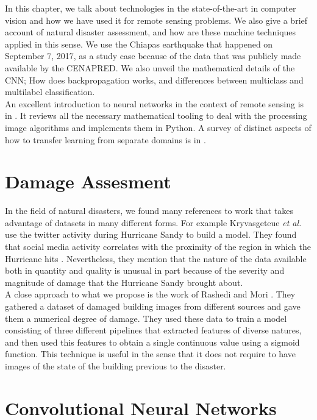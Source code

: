 In this chapter, we talk about technologies in the state-of-the-art in computer vision and how we have used it for remote sensing problems. We also give a brief account of natural disaster assessment, and how are these machine techniques applied in this sense. We use the Chiapas earthquake that happened on September 7, 2017, as a study case because of the data that was publicly made available by the CENAPRED. We also unveil the mathematical details of the CNN; How does backpropagation works, and differences between multiclass and multilabel classification.\\

An excellent introduction to neural networks in the context of remote sensing is in \cite{canty2014image}. It reviews all the necessary mathematical tooling to deal with the processing image algorithms and implements them in Python. A survey of distinct aspects of how to transfer learning from separate domains is in \cite{5288526}.\\

\section{Damage Assesment}

In the field of natural disasters, we found many references to work that takes advantage of datasets in many different forms. For example Kryvasgeteue \textit{et al.} use the twitter activity during  Hurricane Sandy to build a model. They found that social media activity correlates with the proximity of the region in which the Hurricane hits \cite{Kryvasheyeue1500779}. Nevertheless, they mention that the nature of the data available both in quantity and quality is unusual in part because of the severity and magnitude of damage that the Hurricane Sandy brought about.\\

A close approach to what we propose is the work of Rashedi and Mori \cite{Nia2017BuildingDA}. They gathered a dataset of damaged building images from different sources and gave them a numerical degree of damage. They used these data to train a model consisting of three different pipelines that extracted features of diverse natures, and then used this features to obtain a single continuous value using a sigmoid function. This technique is useful in the sense that it does not require to have images of the state of the building previous to the disaster.\\


\section{Convolutional Neural Networks}

